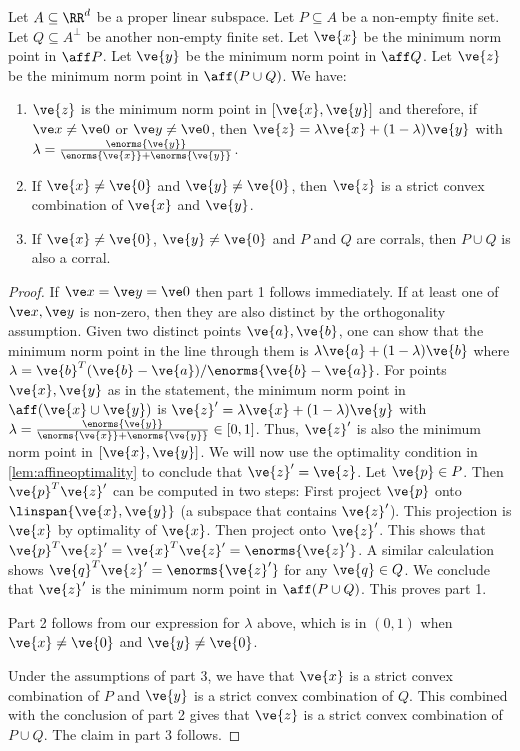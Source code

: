 \begin{lemma}\label{lem:orthogonal}
Let $A\subseteq \RR^d$ be a proper linear subspace. 
Let $P \subseteq A$ be a non-empty finite set. 
Let $Q \subseteq A^\perp$ be another non-empty finite set. 
Let $\ve{x}$ be the minimum norm point in $\aff P$. Let $\ve{y}$ be the minimum norm point in $\aff Q$. 
Let $\ve{z}$ be the minimum norm point in $\aff (P \cup Q)$.
We have:
\begin{enumerate}
\item 
$\ve{z}$ is the minimum norm point in $[\ve{x}, \ve{y}]$ and therefore, if $\ve x \neq \ve 0$ or $\ve y \neq \ve 0$, then $\ve{z} = \lambda \ve{x} + (1-\lambda) \ve{y}$ with $\lambda = \frac{\enorms{\ve{y}}}{\enorms{\ve{x}} + \enorms{\ve{y}}}$.

\item
If $\ve{x} \neq \ve{0}$ and $\ve{y} \neq \ve{0}$, then $\ve{z}$ is a strict convex combination of $\ve{x}$ and $\ve{y}$.

\item
If $\ve{x} \neq \ve{0}$, $\ve{y} \neq \ve{0}$ and $P$ and $Q$ are corrals, then $P \cup Q$ is also a corral.
\end{enumerate}
\end{lemma}
\begin{proof}
If $\ve x=\ve y=\ve 0$ then part 1 follows immediately. 
If at least one of $\ve x, \ve y$ is non-zero, then they are also distinct by the orthogonality assumption.
Given two distinct points $\ve{a}, \ve{b}$, one can show that the minimum norm point in the line through them is $\lambda \ve{a} + (1-\lambda)\ve{b}$ where $\lambda = \ve{b}^T (\ve{b}-\ve{a})/\enorms{\ve{b}-\ve{a}}$.
For points $\ve{x}, \ve{y}$ as in the statement, the minimum norm point in $\aff (\ve{x} \cup \ve{y})$ is $\ve{z}' = \lambda \ve{x} + (1-\lambda)\ve{y}$ with $\lambda = \frac{\enorms{\ve{y}}}{\enorms{\ve{x}} + \enorms{\ve{y}}} \in [0,1]$. Thus, $\ve{z}'$ is also the minimum norm point in $[\ve{x},\ve{y}]$.
We will now use the optimality condition in \cref{lem:affineoptimality} to conclude that $\ve{z}' = \ve{z}$.
Let $\ve{p} \in P$.
Then $\ve{p}^T \ve{z}'$ can be computed in two steps: 
First project $\ve{p}$ onto $\linspan{\ve{x},\ve{y}}$ (a subspace that contains $\ve{z}'$). This projection is $\ve{x}$ by optimality of $\ve{x}$. 
Then project onto $\ve{z}'$. This shows that $\ve{p}^T \ve{z}' = \ve{x}^T \ve{z}' = \enorms{\ve{z}'}$.
A similar calculation shows $\ve{q}^T \ve{z}' = \enorms{\ve{z}'}$ for any $\ve{q} \in Q$. 
We conclude that $\ve{z}'$ is the minimum norm point in $\aff (P \cup Q)$.
This proves part 1.

Part 2 follows from our expression for $\lambda$ above, which is in $(0,1)$ when $\ve{x} \neq \ve{0}$ and $\ve{y} \neq \ve{0}$.

Under the assumptions of part 3, we have that $\ve{x}$ is a strict convex combination of $P$ and $\ve{y}$ is a strict convex combination of $Q$. This combined with the conclusion of part 2 gives that $\ve{z}$ is a strict convex combination of $P\cup Q$. The claim in part 3 follows.
\end{proof}

